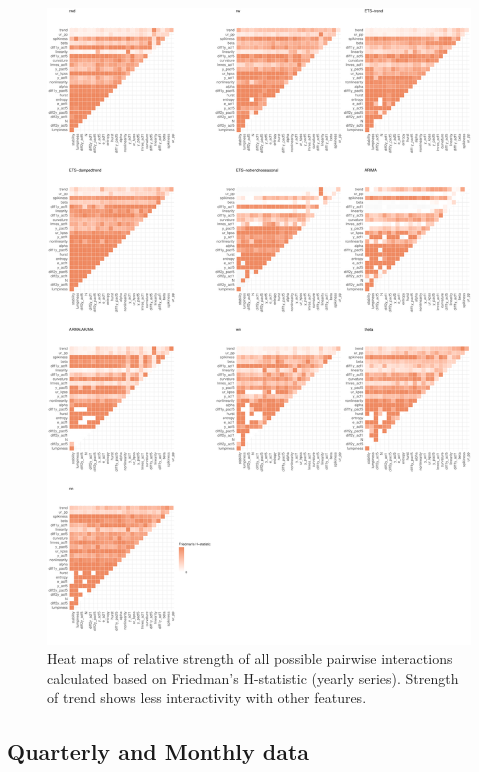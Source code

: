 \documentclass[11pt,a4paper,]{article}
\begin{document}
\begin{figure}
\centering
\includegraphics{figures/friedmany-1.pdf}
\caption{\label{fig:friedmany}Heat maps of relative strength of all possible
pairwise interactions calculated based on Friedman's H-statistic (yearly
series). Strength of trend shows less interactivity with other
features.}
\end{figure}

\newpage

\subsection{Quarterly and Monthly
data}\label{quarterly-and-monthly-data}
\end{document}
